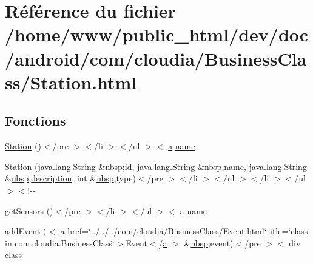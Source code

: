 \hypertarget{_station_8html}{\section{Référence du fichier /home/www/public\-\_\-html/dev/doc/android/com/cloudia/\-Business\-Class/\-Station.html}
\label{_station_8html}
}
\subsection*{Fonctions}
\begin{DoxyCompactItemize}
\item 
\hyperlink{_station_8html_a4177b8ce821107e5e4322d6244e6080a}{Station} ()$<$/pre $>$$<$/li $>$$<$/ul $>$$<$ \hyperlink{style_8css_a5e8981582017bb8b84c21f148345d1f7}{a} \hyperlink{_cloudia_d_b_8html_ab74e6bf80237ddc4109968cedc58c151}{name}
\item 
\hyperlink{_station_8html_ae5c92a64387868d7b8468a3523e461a3}{Station} (java.\-lang.\-String \&\hyperlink{_tools_8html_aef915316f784c9063d942974538301a6}{nbsp};\hyperlink{index-9_8html_aa9b8ff1d03b739d1e752b9d9a5aa7c98}{id}, java.\-lang.\-String \&\hyperlink{_tools_8html_aef915316f784c9063d942974538301a6}{nbsp};\hyperlink{_cloudia_d_b_8html_ab74e6bf80237ddc4109968cedc58c151}{name}, java.\-lang.\-String \&\hyperlink{_tools_8html_aef915316f784c9063d942974538301a6}{nbsp};\hyperlink{_cloudia_d_b_8html_a2661f439a4a94ffdcd5e47ae1da0bb1d}{description}, int \&\hyperlink{_tools_8html_aef915316f784c9063d942974538301a6}{nbsp};type)$<$/pre $>$$<$/li $>$$<$/ul $>$$<$/li $>$$<$/ul $>$$<$!-\/-\/
\item 
\hyperlink{_station_8html_a37fc39e9928dacf5cbf626792ccd0dc5}{get\-Sensors} ()$<$/pre $>$$<$/li $>$$<$/ul $>$$<$ \hyperlink{style_8css_a5e8981582017bb8b84c21f148345d1f7}{a} \hyperlink{_cloudia_d_b_8html_ab74e6bf80237ddc4109968cedc58c151}{name}
\item 
\hyperlink{_station_8html_a406e31430d4491bf75e6919f3782485e}{add\-Event} ($<$ \hyperlink{style_8css_a5e8981582017bb8b84c21f148345d1f7}{a} href=\char`\"{}../../../com/cloudia/Business\-Class/Event.\-html\char`\"{}title=\char`\"{}class in com.\-cloudia.\-Business\-Class\char`\"{}$>$Event$<$/\hyperlink{style_8css_a5e8981582017bb8b84c21f148345d1f7}{a} $>$ \&\hyperlink{_tools_8html_aef915316f784c9063d942974538301a6}{nbsp};event)$<$/pre $>$$<$ div \hyperlink{_tools_8html_acf06f836132665ba8114f5a414c2403f}{class}

\end{DoxyCompactItemize}
